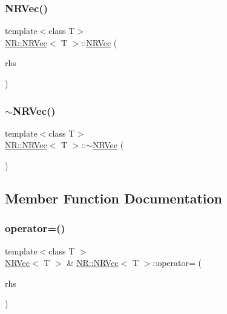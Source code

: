 \mbox{\label{classNR_1_1NRVec_a89f4e31b7ca536611076d5ad70f84770}} 
\subsubsection{\texorpdfstring{NRVec()}{NRVec()}\hspace{0.1cm}{\footnotesize\ttfamily [10/10]}}
{\footnotesize\ttfamily template$<$class T$>$ \\
\mbox{\hyperlink{classNR_1_1NRVec}{N\+R\+::\+N\+R\+Vec}}$<$ T $>$\+::\mbox{\hyperlink{classNR_1_1NRVec}{N\+R\+Vec}} (\begin{DoxyParamCaption}\item[{const \mbox{\hyperlink{classNR_1_1NRVec}{N\+R\+Vec}}$<$ T $>$ \&}]{rhs }\end{DoxyParamCaption})}

\mbox{\label{classNR_1_1NRVec_a7161dfe4a95a73eca56d084c662f8eae}} 
\subsubsection{\texorpdfstring{$\sim$NRVec()}{~NRVec()}\hspace{0.1cm}{\footnotesize\ttfamily [2/2]}}
{\footnotesize\ttfamily template$<$class T$>$ \\
\mbox{\hyperlink{classNR_1_1NRVec}{N\+R\+::\+N\+R\+Vec}}$<$ T $>$\+::$\sim$\mbox{\hyperlink{classNR_1_1NRVec}{N\+R\+Vec}} (\begin{DoxyParamCaption}{ }\end{DoxyParamCaption})}



\subsection{Member Function Documentation}
\mbox{\label{classNR_1_1NRVec_a7a84b82248fd96b304123602029e0ef1}} 
\subsubsection{\texorpdfstring{operator=()}{operator=()}\hspace{0.1cm}{\footnotesize\ttfamily [1/4]}}
{\footnotesize\ttfamily template$<$class T $>$ \\
\mbox{\hyperlink{classNR_1_1NRVec}{N\+R\+Vec}}$<$ T $>$ \& \mbox{\hyperlink{classNR_1_1NRVec}{N\+R\+::\+N\+R\+Vec}}$<$ T $>$\+::operator= (\begin{DoxyParamCaption}\item[{const \mbox{\hyperlink{classNR_1_1NRVec}{N\+R\+Vec}}$<$ T $>$ \&}]{rhs }\end{DoxyParamCaption})}

